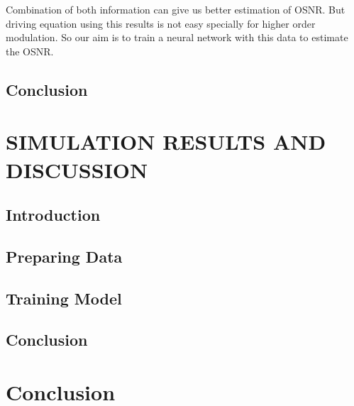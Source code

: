 \documentclass[12pt]{report}
\begin{document}
Combination of both information can give us better estimation of OSNR. But driving equation using this results is not easy specially for higher order modulation. So our aim is to train a neural network with this data to estimate the OSNR.
\section{Conclusion}


\chapter{SIMULATION RESULTS AND DISCUSSION}
\section{Introduction}
\section{Preparing Data}
\section{Training Model}
\section{Conclusion}


\chapter{Conclusion}
\end{document}
